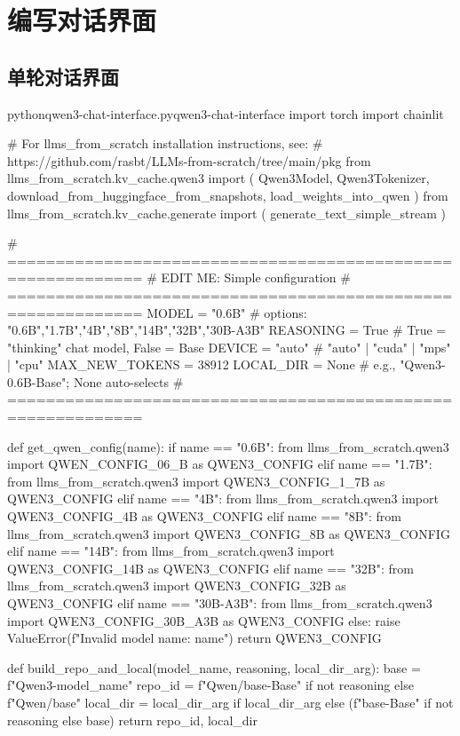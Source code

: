 \documentclass[lang=cn,newtx,10pt,scheme=chinese]{elegantbook}
\begin{document}
\section{编写对话界面}

\subsection{单轮对话界面}

\begin{codebox}{python}{qwen3-chat-interface.py}{qwen3-chat-interface}
import torch
import chainlit

# For llms_from_scratch installation instructions, see:
# https://github.com/rasbt/LLMs-from-scratch/tree/main/pkg
from llms_from_scratch.kv_cache.qwen3 import (
    Qwen3Model,
    Qwen3Tokenizer,
    download_from_huggingface_from_snapshots,
    load_weights_into_qwen
)
from llms_from_scratch.kv_cache.generate import (
    generate_text_simple_stream
)

# ============================================================
# EDIT ME: Simple configuration
# ============================================================
MODEL = "0.6B"            # options: "0.6B","1.7B","4B","8B","14B","32B","30B-A3B"
REASONING = True          # True = "thinking" chat model, False = Base
DEVICE = "auto"           # "auto" | "cuda" | "mps" | "cpu"
MAX_NEW_TOKENS = 38912
LOCAL_DIR = None          # e.g., "Qwen3-0.6B-Base"; None auto-selects
# ============================================================


def get_qwen_config(name):
    if name == "0.6B":
        from llms_from_scratch.qwen3 import QWEN_CONFIG_06_B as QWEN3_CONFIG
    elif name == "1.7B":
        from llms_from_scratch.qwen3 import QWEN3_CONFIG_1_7B as QWEN3_CONFIG
    elif name == "4B":
        from llms_from_scratch.qwen3 import QWEN3_CONFIG_4B as QWEN3_CONFIG
    elif name == "8B":
        from llms_from_scratch.qwen3 import QWEN3_CONFIG_8B as QWEN3_CONFIG
    elif name == "14B":
        from llms_from_scratch.qwen3 import QWEN3_CONFIG_14B as QWEN3_CONFIG
    elif name == "32B":
        from llms_from_scratch.qwen3 import QWEN3_CONFIG_32B as QWEN3_CONFIG
    elif name == "30B-A3B":
        from llms_from_scratch.qwen3 import QWEN3_CONFIG_30B_A3B as QWEN3_CONFIG
    else:
        raise ValueError(f"Invalid model name: {name}")
    return QWEN3_CONFIG


def build_repo_and_local(model_name, reasoning, local_dir_arg):
    base = f"Qwen3-{model_name}"
    repo_id = f"Qwen/{base}-Base" if not reasoning else f"Qwen/{base}"
    local_dir = local_dir_arg if local_dir_arg else (f"{base}-Base" if not reasoning else base)
    return repo_id, local_dir



\end{codebox}
\end{document}
